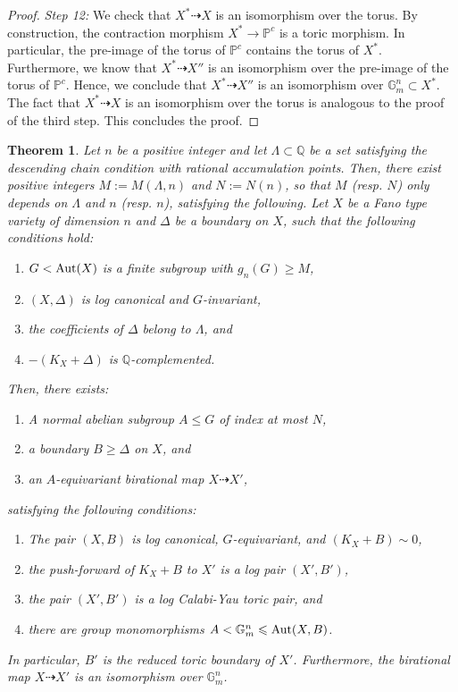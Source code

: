 \documentclass{amsart}
\newcommand{\pp}{\mathbb{P}}
\renewcommand{\qq}{\mathbb{Q}}
\newtheorem{theorem}{Theorem}[section]
\theoremstyle{remark}
\numberwithin{equation}{section}
\begin{document}
\begin{proof}
\textit{Step 12:} We check that $X^*\dashrightarrow X$ is an isomorphism over the torus.
By construction, the contraction morphism $X^*\rightarrow \pp^c$ is a toric morphism.
In particular, the pre-image of the torus of $\pp^c$ contains the torus of $X^*$.
Furthermore, we know that $X^* \dashrightarrow X''$
is an isomorphism over the pre-image of the torus of $\pp^c$.
Hence, we conclude that $X^*\dashrightarrow X''$ is an isomorphism over $\mathbb{G}_m^n\subset X^*$.
The fact that $X^*\dashrightarrow X$ is an isomorphism over the torus is analogous to the proof of the third step. This concludes the proof.
\end{proof}

\begin{theorem}\label{thm:FT-full-rank-non-abelian-G}
Let $n$ be a positive integer and
let $\Lambda\subset \qq$ be a set satisfying the descending chain condition with rational accumulation points.
Then, there exist positive integers
$M:=M(\Lambda,n)$ and $N:=N(n)$,
so that $M$ (resp. $N$) only depends on $\Lambda$ and $n$ 
(resp. $n$),
satisfying the following.
Let $X$ be a Fano type variety of dimension $n$ and $\Delta$ be a boundary on $X$, such that the following conditions hold:
\begin{enumerate}
\item $G<{\rm Aut}(X)$ is a finite subgroup with $g_n(G)\geq M$, 
\item $(X,\Delta)$ is log canonical and $G$-invariant,
\item the coefficients of $\Delta$ belong to $\Lambda$, and
\item $-(K_X+\Delta)$ is $\qq$-complemented.
\end{enumerate}
Then, there exists:
\begin{enumerate}
\item A normal abelian subgroup $A\leqslant G$ of index at most $N$,
\item a boundary $B\geqslant \Delta$ on $X$, and
\item an $A$-equivariant birational map $X\dashrightarrow X'$, 
\end{enumerate}
satisfying the following conditions:
\begin{enumerate}
\item The pair $(X,B)$ is log canonical, $G$-equivariant, and 
$(K_X+B)\sim 0$,
\item the push-forward of $K_X+B$ to $X'$ is a log pair $(X',B')$,
\item the pair $(X',B')$ is a log Calabi-Yau toric pair, and
\item there are group monomorphisms
$A<\mathbb{G}_m^n\leqslant {\rm Aut}(X,B)$.
\end{enumerate}
In particular, $B'$ is the reduced toric boundary of $X'$.
Furthermore, the birational map $X\dashrightarrow X'$ is an isomorphism over $\mathbb{G}_m^n$.
\end{theorem}
\end{document}
